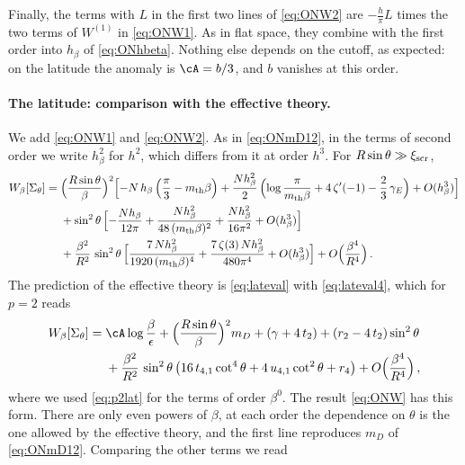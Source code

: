 \documentclass[a4paper,11pt]{article}
\newcommand{\xiscr}{\xi_{\rm scr}}
\begin{document}
Finally, the terms with $L$ in the first two lines of \eqref{eq:ONW2} are $-\tfrac{h}{\pi}L$ times the two terms of $W^{(1)}$ in \eqref{eq:ONW1}. As in flat space, they combine with the first order into $h_\beta$ of \eqref{eq:ONhbeta}. Nothing else depends on the cutoff, as expected: on the latitude the anomaly is $\cA=b/3$, and $b$ vanishes at this order.


\paragraph{The latitude: comparison with the effective theory.}
We add \eqref{eq:ONW1} and \eqref{eq:ONW2}. As in \eqref{eq:ONmD12}, in the terms of second order we write $h_\beta^2$ for $h^2$, which differs from it at order $h^3$. For $R\sin\theta\gg\xiscr$,
\begin{equation}\label{eq:ONW}
	\begin{aligned}
		W_\beta[\Sigma_\theta]={}&\Bigl(\frac{R\sin\theta}{\beta}\Bigr)^{2}\Bigl[-N\,h_\beta\,\Bigl(\frac\pi3-m_{\rm th}\beta\Bigr)+\frac{N h_\beta^2}{2}\,\Bigl(\log\frac{\pi}{m_{\rm th}\beta}+4\,\zeta'(-1)-\frac23\,\gamma_E\Bigr)+O(h_\beta^3)\Bigr]\\
		&+\sin^2\theta\,\Bigl[-\frac{N h_\beta}{12\pi}+\frac{N h_\beta^2}{48\,(m_{\rm th}\beta)^2}+\frac{N h_\beta^2}{16\pi^2}+O(h_\beta^3)\Bigr]\\
		&+\frac{\beta^2}{R^2}\,\sin^2\theta\,\Bigl[\frac{7\,N h_\beta^2}{1920\,(m_{\rm th}\beta)^4}+\frac{7\,\zeta(3)\,N h_\beta^2}{480\pi^4}+O(h_\beta^3)\Bigr]+O\Bigl(\frac{\beta^4}{R^4}\Bigr)\, .
	\end{aligned}
\end{equation}
The prediction of the effective theory is \eqref{eq:lateval} with \eqref{eq:lateval4}, which for $p=2$ reads
\begin{equation}\label{eq:ONpred}
	\begin{aligned}
		W_\beta[\Sigma_\theta]={}&\cA\log\frac\beta\epsilon+\Bigl(\frac{R\sin\theta}{\beta}\Bigr)^{2}m_D+(\gamma+4\,t_2)+(r_2-4\,t_2)\sin^2\theta\\
		&+\frac{\beta^2}{R^2}\,\sin^2\theta\,\bigl(16\,t_{4,1}\cot^4\theta+4\,u_{4,1}\cot^2\theta+r_4\bigr)+O\Bigl(\frac{\beta^4}{R^4}\Bigr)\, ,
	\end{aligned}
\end{equation}
where we used \eqref{eq:p2lat} for the terms of order $\beta^0$. The result \eqref{eq:ONW} has this form. There are only even powers of $\beta$, at each order the dependence on $\theta$ is the one allowed by the effective theory, and the first line reproduces $m_D$ of \eqref{eq:ONmD12}. Comparing the other terms we read
\end{document}

